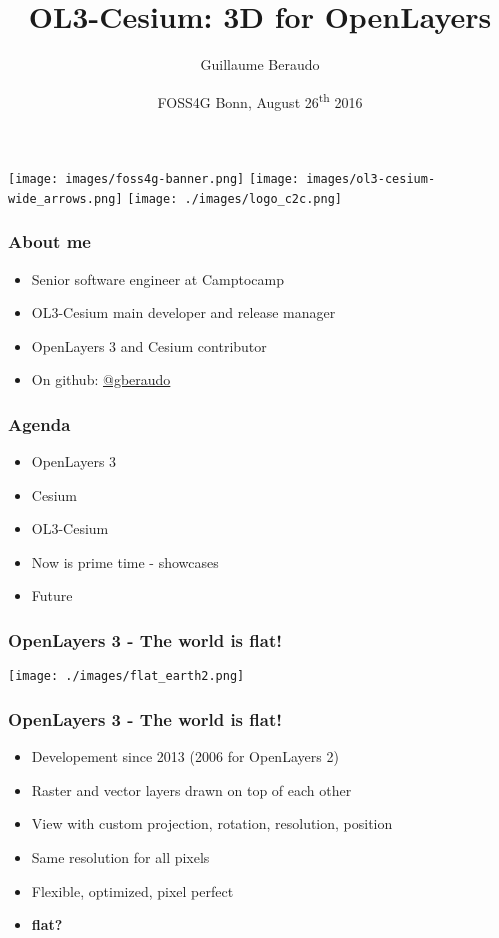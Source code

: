 \documentclass[handout]{beamer}
\title{OL3-Cesium: 3D for OpenLayers}
\author{Guillaume Beraudo}
\date{FOSS4G Bonn, August 26\textsuperscript{th} 2016}
\begin{document}
  \begin{frame}
    \titlepage
    \begin{center}
      \texttt{[image: images/foss4g-banner.png]}
      \texttt{[image: images/ol3-cesium-wide\_arrows.png]}
      \texttt{[image: ./images/logo\_c2c.png]}
    \end{center}
  \end{frame}


  \begin{frame}
    \frametitle{About me}
    \begin{itemize}
      \item Senior software engineer at Camptocamp
      \item OL3-Cesium main developer and release manager
      \item OpenLayers 3 and Cesium contributor
      \item On github: \href {https://github.com/gberaudo}{@gberaudo}
      \end{itemize}
  \end{frame}


  \begin{frame}
    \frametitle{Agenda}
    \begin{itemize}
      \pause\item OpenLayers 3
      \pause\item Cesium
      \pause\item OL3-Cesium
      \pause\item Now is prime time - showcases
      \pause\item Future
      \end{itemize}
  \end{frame}


  \begin{frame}
    \frametitle{OpenLayers 3 - The world is flat!}
    \begin{center}
     \texttt{[image: ./images/flat\_earth2.png]}
    \end{center}
  \end{frame}


  \begin{frame}
    \frametitle{OpenLayers 3 - The world is flat!}
    \begin{itemize}
      \item Developement since 2013 (2006 for OpenLayers 2)
      \pause\item Raster and vector layers drawn on top of each other
      \pause\item View with custom projection, rotation, resolution, position
      \pause\item Same resolution for all pixels
      \pause\item Flexible, optimized, pixel perfect
      \pause\item \textbf{flat?}
     \end{itemize}
  \end{frame}
\end{document}
